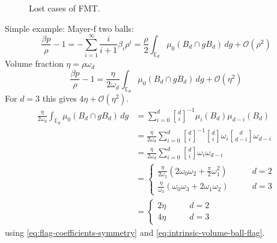 \documentclass[12pt]{report}
\begin{document}
\begin{figure}
  \missingfigure[figwidth=\linewidth]{}
  \caption{Lost cases of FMT.}
  \label{fig:lost-cases}
\end{figure}

Simple example: Mayer-f two balls:
\begin{equation}
  \frac{\beta p}{\rho} - 1 =
  - \sum_{i=1}^\infty \frac{i}{i+1} \beta_i \rho^i =
  \frac{\rho}{2} \int_{\mathbb{E}_d} \mu_0 (B_d \cap g B_d) \, dg
  + \mathcal{O}(\rho^2)
\end{equation}
Volume fraction $\eta = \rho \omega_d$
\begin{equation}
  \frac{\beta p}{\rho} - 1 =
  \frac{\eta}{2 \omega_d}
  \int_{\mathbb{E}_d} \mu_0 (B_d \cap g B_d) \, dg
  + \mathcal{O}(\eta^2)
\end{equation}
For $d = 3$ this gives $4\eta + \mathcal{O}(\eta^2)$.
\begin{align*}
  \frac{\eta}{2 \omega_d}
  \int_{\mathbb{E}_d} \mu_0 (B_d \cap g B_d) \, dg &=
  \sum_{i=0}^{d}
  {d \brack i}^{-1}
  \mu_i(B_d) \mu_{d-i}(B_d) \\
  &=
  \frac{\eta}{2 \omega_d}
  \sum_{i=0}^{d}
  {d \brack i}^{-1}
  {d \brack i} \omega_i
  {d \brack d-i} \omega_{d-i} \\
  &=
  \frac{\eta}{2 \omega_d}
  \sum_{i=0}^{d}
  {d \brack i} \omega_i \omega_{d-i} \\
  &=
  \begin{cases}
    \frac{\eta}{2 \omega_2}
    (2 \omega_0 \omega_2 + \frac{\pi}{2} \omega_1^2)
    & \qquad d=2 \\
    \frac{\eta}{\omega_3}
    (\omega_0 \omega_3 + 2 \omega_1 \omega_2)
    & \qquad d=3
  \end{cases} \\
  &=
  \begin{cases}
    2 \eta & \qquad d=2 \\
    4 \eta & \qquad d=3
  \end{cases}
\end{align*}
using \eqref{eq:flag-coefficients-symmetry} and \eqref{eq:intrinsic-volume-ball-flag}.
\begin{equation*}
\end{equation*}
\end{document}

